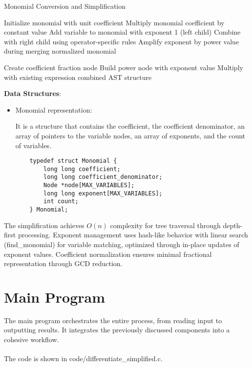 \documentclass{report}
\begin{document}
\begin{algorithm}[H]
\caption{Monomial Conversion and Simplification}
\begin{algorithmic}[1]
    \State Initialize monomial with unit coefficient
        \State Multiply monomial coefficient by constant value
        \State Add variable to monomial with exponent 1
        \State {}(left child)
        \State Combine with right child using operator-specific rules
        \State Amplify exponent by power value during merging
    \EndIf
    \State \Return normalized monomial
\EndProcedure

    \State Create coefficient fraction node
            \State Build power node with exponent value
            \State Multiply with existing expression
        \EndIf
    \EndFor
    \State \Return combined AST structure
\EndProcedure
\end{algorithmic}
\end{algorithm}

\textbf{Data Structures}:
\begin{itemize}
    \item Monomial representation:
    
    It is a structure that contains the coefficient, the coefficient denominator, an array of pointers to the variable nodes, an array of exponents, and the count of variables.
    \begin{verbatim}
    typedef struct Monomial {
        long long coefficient;
        long long coefficient_denominator;
        Node *node[MAX_VARIABLES];
        long long exponent[MAX_VARIABLES];
        int count;
    } Monomial;
    \end{verbatim}
\end{itemize}

The simplification achieves $O(n)$ complexity for tree traversal through depth-first processing. Exponent management uses hash-like behavior with linear search (find\_monomial) for variable matching, optimized through in-place updates of exponent values. Coefficient normalization ensures minimal fractional representation through GCD reduction.

\section*{Main Program}
The main program orchestrates the entire process, from reading input to outputting results. It integrates the previously discussed components into a cohesive workflow. \\
\\
The code is shown in code/differentiate\_simplified.c.
\end{document}
